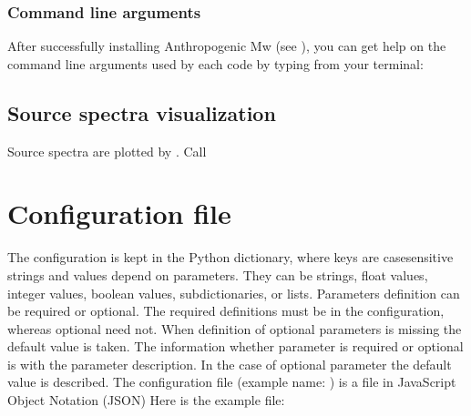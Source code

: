 \documentclass[letterpaper,10pt,english]{sphinxmanual}
\begin{document}
\subsection{Command line arguments}
\label{\detokenize{getting_started:command-line-arguments}}
\sphinxAtStartPar
After successfully installing Anthropogenic Mw (see {\hyperref[\detokenize{installation:installation}]{}}),
you can get help on the command line arguments used by each code by typing from
your terminal:

\begin{sphinxVerbatim}[commandchars=\\\{\}]
 
\end{sphinxVerbatim}


\section{Source spectra visualization}
\label{\detokenize{getting_started:source-spectra-visualization}}
\sphinxAtStartPar
Source spectra are plotted by .
Call

\begin{sphinxVerbatim}[commandchars=\\\{\}]
 
\end{sphinxVerbatim}

\sphinxstepscope


\chapter{Configuration file}
\label{\detokenize{configuration:configuration-file}}\label{\detokenize{configuration:configuration}}\label{\detokenize{configuration::doc}}
\sphinxAtStartPar
The configuration is kept in the Python dictionary,
where keys are case\sphinxhyphen{}sensitive strings and values depend on parameters.
They can be strings, float values, integer values, boolean values, sub\sphinxhyphen{}dictionaries, or lists.
Parameters definition can be required or optional. The required definitions must be in the configuration,
whereas optional need not. When definition of optional parameters is missing the default value is taken.
The information whether parameter is required or optional is with the parameter description.
In the case of optional parameter the default value is described.
The configuration file (example name: ) is a file in JavaScript Object Notation (JSON)
Here is the example file:
\end{document}
